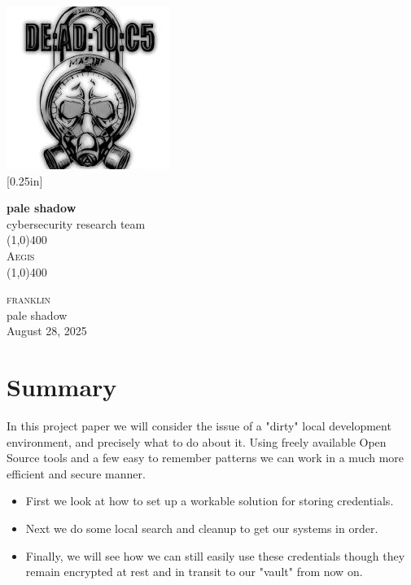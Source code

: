 \documentclass[11pt]{report}
\newcommand{\myTitle}{Aegis}
\newcommand{\myName}{franklin}
\newcommand{\myOrg}{pale shadow}
\newcommand{\myDate}{August 28, 2025}
\begin{document}
	
	\begin{titlepage}
		\begin{center}
			\includegraphics[scale=0.75]{../static/images/new_logo.jpeg}\\
			[0.25in] 
			
			\textbf{\Large{\myOrg}}\\
			\Large{cybersecurity research team}\\
			[1in]
			
			\line(1,0){400}\\
			[2mm]
			\textsc{\Large{\myTitle}} \\
			\line(1,0){400} \\
			[1in]
		\end{center}
		\begin{center}
			\textsc{\Large \myName}	\\
			\myOrg\\
			[1in]
			\myDate
		\end{center}
	\end{titlepage}
	
	\section*{Summary}
    In this project paper we will consider the issue of a "dirty" local development
    environment, and precisely what to do about it. Using freely available
    Open Source tools and a few easy to remember patterns we can work in a
    much more efficient and secure manner.

    \begin{itemize}
    	\item First we look at how to set up a workable solution for storing credentials.
		\item Next we do some local search and cleanup to get our systems in order.
		\item Finally, we will see how we can still easily use these credentials though
			they remain encrypted at rest and in transit to our "vault" from now on.
    \end{itemize}
      
\end{document}
